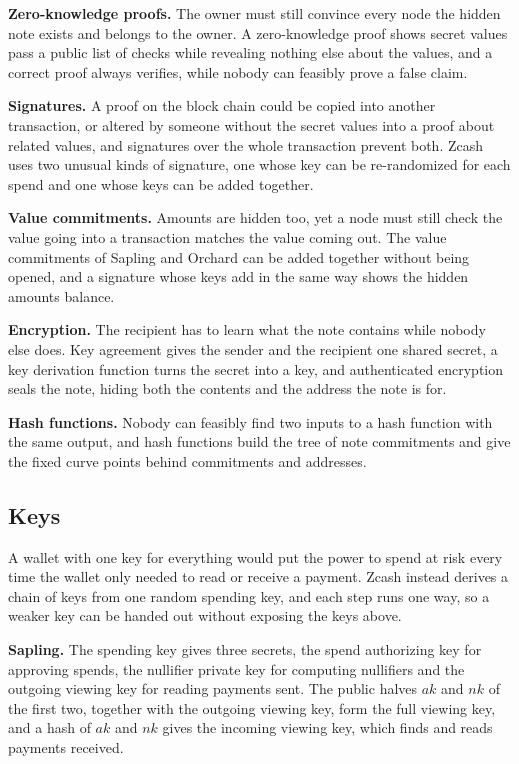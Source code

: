 \documentclass{article}
\newcommand{\lsubsection}[2]{\def\sectionlabel{#2} \subsection{#1}\label{#2}}
\theoremstyle{labelledtheorem} %
\begin{document}
\textbf{Zero-knowledge proofs.} The owner must still convince every node the hidden note exists and belongs to the owner. A zero-knowledge proof shows secret values pass a public list of checks while revealing nothing else about the values, and a correct proof always verifies, while nobody can feasibly prove a false claim.

\textbf{Signatures.} A proof on the block chain could be copied into another transaction, or altered by someone without the secret values into a proof about related values, and signatures over the whole transaction prevent both. Zcash uses two unusual kinds of signature, one whose key can be re-randomized for each spend and one whose keys can be added together.

\textbf{Value commitments.} Amounts are hidden too, yet a node must still check the value going into a transaction matches the value coming out. The value commitments of Sapling and Orchard can be added together without being opened, and a signature whose keys add in the same way shows the hidden amounts balance.

\textbf{Encryption.} The recipient has to learn what the note contains while nobody else does. Key agreement gives the sender and the recipient one shared secret, a key derivation function turns the secret into a key, and authenticated encryption seals the note, hiding both the contents and the address the note is for.

\textbf{Hash functions.} Nobody can feasibly find two inputs to a hash function with the same output, and hash functions build the tree of note commitments and give the fixed curve points behind commitments and addresses.

\lsubsection{Keys}{readablekeys}
\label{orchardkeycomponents}\label{saplingkeycomponents}\label{sproutkeycomponents}%

A wallet with one key for everything would put the power to spend at risk every time the wallet only needed to read or receive a payment. Zcash instead derives a chain of keys from one random spending key, and each step runs one way, so a weaker key can be handed out without exposing the keys above.

\textbf{Sapling.} The spending key gives three secrets, the spend authorizing key for approving spends, the nullifier private key for computing nullifiers and the outgoing viewing key for reading payments sent. The public halves $\mathit{ak}$ and $\mathit{nk}$ of the first two, together with the outgoing viewing key, form the full viewing key, and a hash of $\mathit{ak}$ and $\mathit{nk}$ gives the incoming viewing key, which finds and reads payments received.
\end{document}
